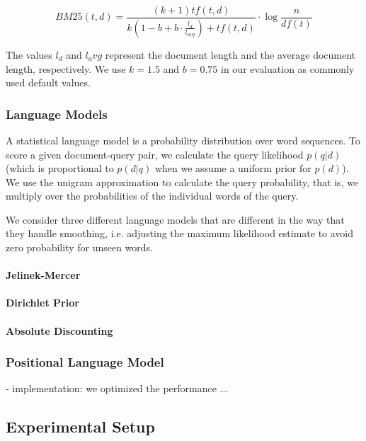 \begin{equation*}
BM25(t,d) = \frac{(k + 1) tf(t,d)}{k(1 - b + b \cdot \frac{l_d}{l_{avg}} ) + tf(t,d)} \cdot \log\frac{n}{df(t)} 
\end{equation*}

The values $l_d$ and $l_avg$ represent the document length and the average
document length, respectively.
We use $k = 1.5$ and $b = 0.75$ in our evaluation as commonly used default values.
 
\subsubsection{Language Models}

A statistical language model is a probability distribution over word sequences.
To score a given document-query pair, we calculate the query likelihood
$p(q|d)$ (which is proportional to $p(d|q)$ when we assume a uniform prior for $p(d)$).
We use the unigram approximation to calculate the query probability,
that is, we multiply over the probabilities of the individual words of the query.

We consider three different language models that are different in the way that
they handle smoothing, i.e. adjusting the maximum likelihood estimate to avoid 
zero probability for unseen words.

\paragraph{Jelinek-Mercer}

\paragraph{Dirichlet Prior}

\paragraph{Absolute Discounting}


\subsubsection{Positional Language Model}

- implementation: we optimized the performance ...


\subsection{Experimental Setup}

